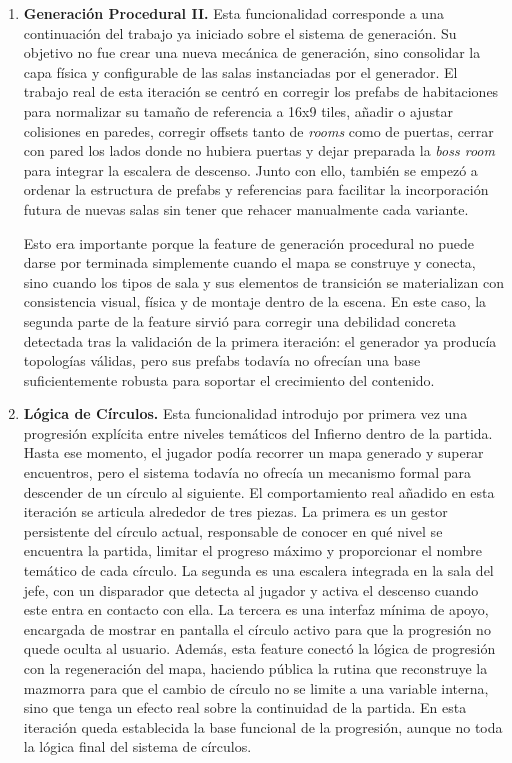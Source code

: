 \begin{enumerate}
\item \textbf{Generación Procedural II.} Esta funcionalidad corresponde a una continuación del
trabajo ya iniciado sobre el sistema de generación. Su objetivo no fue crear una
nueva mecánica de generación, sino consolidar la capa física y configurable de las salas
instanciadas por el generador. El trabajo real de esta iteración se centró en corregir los
prefabs de habitaciones para normalizar su tamaño de referencia a 16x9 tiles, añadir o
ajustar colisiones en paredes, corregir offsets tanto de \textit{rooms} como de puertas,
cerrar con pared los lados donde no hubiera puertas y dejar preparada la \textit{boss room}
para integrar la escalera de descenso. Junto con ello, también se empezó a ordenar la
estructura de prefabs y referencias para facilitar la incorporación futura de nuevas salas
sin tener que rehacer manualmente cada variante.

Esto era importante porque la feature de generación procedural no puede darse por terminada
simplemente cuando el mapa se construye y conecta, sino cuando los tipos de sala y sus
elementos de transición se materializan con consistencia visual, física y de montaje dentro
de la escena. En este caso, la segunda parte de la feature sirvió para corregir una
debilidad concreta detectada tras la validación de la primera iteración: el generador ya
producía topologías válidas, pero sus prefabs todavía no ofrecían una base suficientemente
robusta para soportar el crecimiento del contenido.

\item \textbf{Lógica de Círculos.} Esta funcionalidad introdujo por primera vez una
progresión explícita entre niveles temáticos del Infierno dentro de la partida. Hasta ese
momento, el jugador podía recorrer un mapa generado y superar encuentros, pero el sistema
todavía no ofrecía un mecanismo formal para descender de un círculo al siguiente. El
comportamiento real añadido en esta iteración se articula alrededor de tres piezas. La
primera es un gestor persistente del círculo actual, responsable de conocer en qué nivel se
encuentra la partida, limitar el progreso máximo y proporcionar el nombre temático de cada
círculo. La segunda es una escalera integrada en la sala del jefe, con un disparador que
detecta al jugador y activa el descenso cuando este entra en contacto con ella. La tercera
es una interfaz mínima de apoyo, encargada de mostrar en pantalla el círculo activo para
que la progresión no quede oculta al usuario. Además, esta feature conectó la lógica de
progresión con la regeneración del mapa, haciendo pública la rutina que reconstruye la
mazmorra para que el cambio de círculo no se limite a una variable interna, sino que tenga
un efecto real sobre la continuidad de la partida. En esta iteración queda establecida la
base funcional de la progresión, aunque no toda la lógica final del sistema de círculos.


\end{enumerate}
